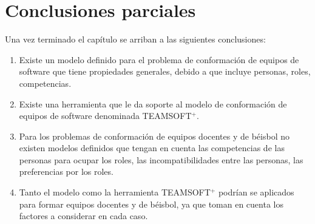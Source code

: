 \section{Conclusiones parciales}
Una vez terminado el capítulo se arriban a las siguientes conclusiones:
\begin{enumerate}
	\item Existe un modelo definido para el problema de conformación de equipos de software que tiene propiedades generales, debido a que incluye personas, roles, competencias.
	\item Existe una herramienta que le da soporte al modelo de conformación de equipos de software denominada TEAMSOFT$^+$.
	\item Para los problemas de conformación de equipos docentes y de béisbol no existen modelos definidos que tengan en cuenta las competencias de las personas para ocupar los roles, las incompatibilidades entre las personas, las preferencias por los roles.
	\item Tanto el modelo como la herramienta TEAMSOFT$^+$ podrían se aplicados para formar equipos docentes y de béisbol, ya que toman en cuenta los factores a considerar en cada caso.
\end{enumerate}
\pagebreak
%
